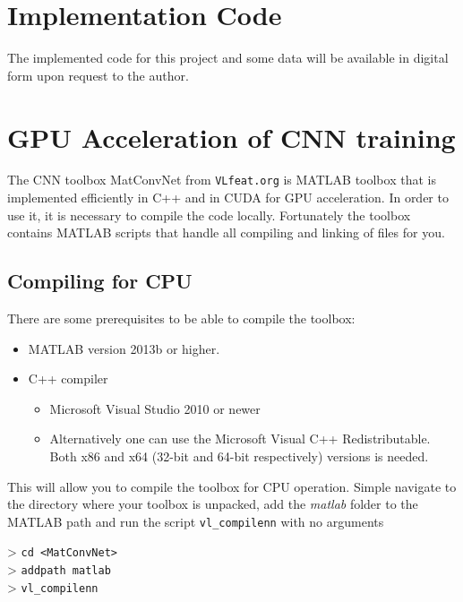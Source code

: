 \documentclass[Main]{subfiles}
\begin{document}
\section{Implementation Code} %
	\label{sec:code}
	The implemented code for this project and some data will be available in digital form upon request to the author.




\newpage
\section{GPU Acceleration of CNN training} %
	\label{sec:gpu_acceleration_of_cnn_training}
	The CNN toolbox MatConvNet from \texttt{VLfeat.org} is MATLAB toolbox that is implemented efficiently in C++ and in CUDA for GPU acceleration.
	In order to use it, it is necessary to compile the code locally.
	Fortunately the toolbox contains MATLAB scripts that handle all compiling and linking of files for you.

	\subsection{Compiling for CPU} %
		\label{sub:compiling_for_cpu}
		There are some prerequisites to be able to compile the toolbox:
		\begin{itemize}
			\item
			MATLAB version 2013b or higher.

			\item
			C++ compiler
			\begin{itemize}
				\item
				Microsoft Visual Studio 2010 or newer

				\item
				Alternatively one can use the Microsoft Visual C++ Redistributable. Both x86 and x64 (32-bit and 64-bit respectively) versions is needed.
			\end{itemize}

		\end{itemize}

		This will allow you to compile the toolbox for CPU operation. Simple navigate to the directory where your toolbox is unpacked, add the \emph{matlab} folder to the MATLAB path and run the script \texttt{vl\_compilenn} with no arguments

		> \texttt{cd <MatConvNet>}\\
		> \texttt{addpath matlab}\\
		> \texttt{vl\_compilenn}\\
\end{document}
